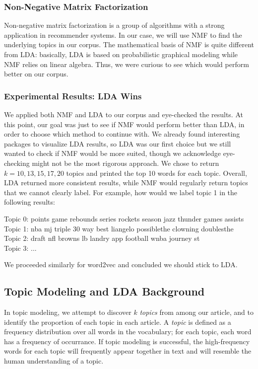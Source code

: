 \documentclass[11pt]{article}
\begin{document}
\subsubsection{Non-Negative Matrix Factorization}

Non-negative matrix factorization is a group of algorithms with a strong application in recommender
systems. In our case, we will use NMF to find the underlying topics in our corpus. The mathematical
basis of NMF is quite different from LDA: basically, LDA is based on probabilistic graphical modeling
while NMF relies on linear algebra. Thus, we were curious to see which would perform better on
our corpus.

\subsubsection{Experimental Results: LDA Wins}
We applied both NMF and LDA to our corpus and eye-checked the results. At this point, our goal
was just to see if NMF would perform better than LDA, in order to choose which method to
continue with. We already found interesting packages to visualize LDA results, so
LDA was our first choice but we still wanted to check if NMF would be more suited,
though we acknowledge eye-checking might not be the most rigorous approach.
We chose to return $k=10, 13, 15, 17, 20$ topics and printed the top 10 words for each topic.
Overall, LDA returned more consistent results, while NMF would regularly return topics that 
we cannot clearly label. For example, how would we label topic 1 in the following results:

\begin{ttfamily}
 Topic 0: points game rebounds series rockets season jazz thunder games assists\\
Topic 1: nba mj triple 30 way best liangelo possiblethe clowning doublesthe\\
Topic 2: draft nfl browns lb landry app football wnba journey st\\
Topic 3: ...
\end{ttfamily}

We proceeded similarly for word2vec and concluded we should stick to LDA.

\subsection{Topic Modeling and LDA Background}
In topic modeling, we attempt to discover $k$ \textit{topics} from among our article, and to identify the proportion of each topic in each article.  A \textit{topic} is defined as a frequency distribution over all words in the vocabulary; for each topic, each word has a frequency of occurrance.  If topic modeling is successful, the high-frequency words for each topic will frequently appear together in text and will resemble the human understanding of a topic. 
\end{document}
